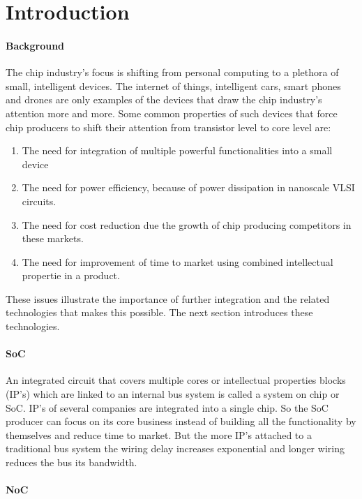 \section{Introduction}

\paragraph{Background} \cite{SoC-market}

The chip industry's focus is shifting from personal computing to 
a plethora of small, intelligent devices. The internet of things, intelligent cars,
smart phones and drones are only examples of the devices that draw the chip industry's 
attention more and more. 
Some common properties of such devices that force chip producers to shift their attention 
from transistor level to core level are:

\begin{enumerate}
\item The need for integration of multiple powerful functionalities into a small device
\item The need for power efficiency, because of power dissipation in nanoscale VLSI circuits. 
\item The need for cost reduction due the growth of chip producing competitors in these markets.
\item The need for improvement of time to market using combined intellectual propertie in a product.
\end{enumerate}

These issues illustrate the importance of further integration and the
related technologies that makes this possible. The next section introduces these technologies.

\paragraph{SoC}

An integrated circuit that covers multiple cores or intellectual properties
blocks (IP's) which are linked to an internal bus system is called a system on
chip or SoC. IP's of several companies are integrated into a single chip. So the
SoC producer can focus on its core business instead of building all the
functionality by themselves and reduce time to market. But the more IP's attached
to a traditional bus system the wiring delay increases exponential and longer
wiring reduces the bus its bandwidth.\cite{SoC}

\paragraph{NoC}


